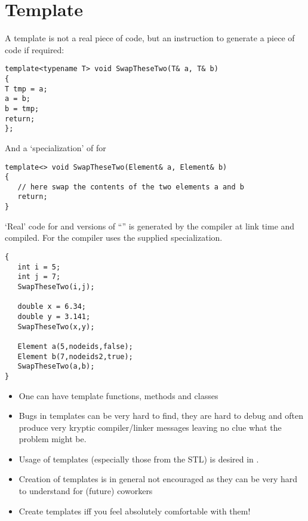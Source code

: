 \section{Template}
A template is not a real piece of code, but an instruction to generate a piece of
code if required:\\
\begin{boxedminipage}{\linewidth}
\begin{verbatim}
template<typename T> void SwapTheseTwo(T& a, T& b)
{
T tmp = a;
a = b;
b = tmp;
return;
};
\end{verbatim}
\end{boxedminipage}
And a `specialization' of  for \\
\begin{boxedminipage}{\linewidth}
\begin{verbatim}
template<> void SwapTheseTwo(Element& a, Element& b)
{
   // here swap the contents of the two elements a and b
   return;
}
\end{verbatim}
\end{boxedminipage}
`Real' code for  and  versions of ``'' is generated
by the compiler at link time and compiled.
For  the compiler uses the supplied
specialization.\\
\begin{boxedminipage}{\linewidth}
\begin{verbatim}
{
   int i = 5;
   int j = 7;
   SwapTheseTwo(i,j);

   double x = 6.34;
   double y = 3.141;
   SwapTheseTwo(x,y);

   Element a(5,nodeids,false);
   Element b(7,nodeids2,true);
   SwapTheseTwo(a,b);
}
\end{verbatim}
\end{boxedminipage}
\begin{itemize}
\item One can have template functions, methods and classes
\item Bugs in templates can be very hard to find, they are hard to debug and often produce
very kryptic compiler/linker messages leaving no clue what the problem might be.
\item Usage of templates (especially those from the STL) is desired in \baci{}.
\item Creation of templates is in general not encouraged as they can be very hard to
understand for (future) coworkers
\item Create templates iff you feel absolutely comfortable with them!
\end{itemize}

